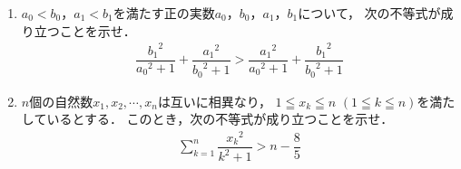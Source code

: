 \documentclass[../../main.tex]{subfiles}
\begin{document}
\begin{enumerate}
  \item $a_0<b_0$，$a_1<b_1$を満たす正の実数$a_0$，$b_0$，$a_1$，$b_1$について，
    次の不等式が成り立つことを示せ．
    \begin{align*}
      \dfrac{{b_1}^2}{{a_0}^2+1}+\dfrac{{a_1}^2}{{b_0}^2+1}>\dfrac{{a_1}^2}{{a_0}^2+1}+\dfrac{{b_1}^2}{{b_0}^2+1}
    \end{align*}
  \item $n$個の自然数$x_1,x_2,\cdots,x_n$は互いに相異なり，
    $1 \leqq x_k \leqq n$ $(1 \leqq k \leqq n)$を満たしているとする．
    このとき，次の不等式が成り立つことを示せ．
    \begin{align*}
      \sum_{k=1}^n\dfrac{{x_k}^2}{k^2+1}>n-\dfrac{8}{5}
    \end{align*}
\end{enumerate}
\end{document}

